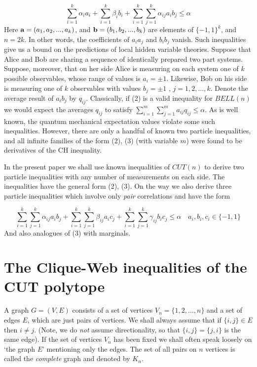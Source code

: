 \begin{equation}
\sum_{i=1}^{k}\alpha _{i}a_{i}+\sum_{i=1}^{k}\beta
_{i}b_{i}+\sum_{i=1}^{k}\sum_{j=1}^{k}\alpha _{ij}a_{i}b_{j}\leq \alpha
\end{equation}
Here ${\bf a}=(a_{1},a_{2},...,a_{k})$, and ${\bf b}=(b_{1},b_{2},...,b_{k})$
are elements of $\{-1,1\}^{k}$, and $n=2k$. In other words, the coefficients
of $a_{i}a_{j}$ and $b_{i}b_{j}$ vanish. Such inequalities give us a bound
on the predictions of local hidden variable theories. Suppose that Alice and
Bob are sharing a sequence of identically prepared two part systems.
Suppose, moreover, that on her side Alice is measuring on each system one of
$k$ possible observables, whose range of values is $a_{i}=\pm 1$. Likewise,
Bob on his side is measuring one of $k$ observables with values $b_{j}=\pm 1$%
, $j=1,2,...,k$. Denote the average result of $a_{i}b_{j}$ by $q_{ij}$.
Classically, if (2) is a valid inequality for $BELL(n)$ we would expect the
averages $q_{ij}$ to satisfy $\sum_{i=1}^{m}\sum_{j=1}^{m}a_{ij}q_{ij}\leq
\alpha $. As is well known, the quantum mechanical expectation values
violate some such inequalities. However, there are only a handful of known
two particle inequalities, and all infinite families of the form (2), (3)
(with variable $m$) were found to be derivatives of the CH inequality.

In the present paper we shall use known inequalities of $CUT(n)$ to derive
two particle inequalities with any number of measurements on each side. The
inequalities have the general form (2), (3). On the way we also derive three
particle inequalities which involve only {\em pair} correlations and have
the form

\begin{equation}
\sum_{i=1}^{k}\sum_{j=1}^{k}\alpha
_{ij}a_{i}b_{j}+\sum_{i=1}^{k}\sum_{j=1}^{k}\beta
_{ij}a_{i}c_{j}+\sum_{i=1}^{k}\sum_{j=1}^{k}\gamma _{ij}b_{i}c_{j}\leq
\alpha \quad a_{i},b_{i},c_{i}\in \{-1,1\}
\end{equation}
And also analogues of (3) with marginals.

\section{The Clique-Web inequalities of the CUT polytope}

A graph $G=(V,E)$ consists of a set of vertices $V_{n}=\{1,2,...,n\}$ and a
set of edges $E$, which are just pairs of vertices. We shall always assume
that if $\{i,j\}\in E$ then $i\neq j$. (Note, we do {\em not} assume
directionality, so that $\{i,j\}=\{j,i\}$ is the same edge). If the set of
vertices $V_{n}$ has been fixed we shall often speak loosely on `the graph $%
E $' mentioning only the edges. The set of all pairs on $n$ vertices is
called the {\em complete} graph and denoted by $K_{n}$.

